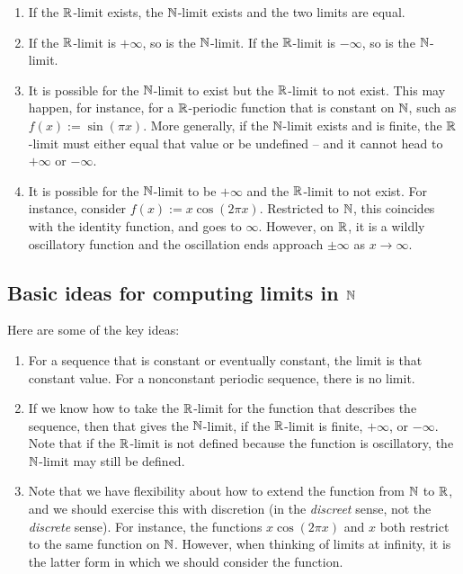 \documentclass[10pt]{amsart}
\begin{document}
\begin{enumerate}
\item If the $\mathbb{R}$-limit exists, the $\mathbb{N}$-limit exists and the two
  limits are equal.
\item If the $\mathbb{R}$-limit is $+\infty$, so is the $\mathbb{N}$-limit. If the
  $\mathbb{R}$-limit is $-\infty$, so is the $\mathbb{N}$-limit.
\item It is possible for the $\mathbb{N}$-limit to exist but the $\mathbb{R}$-limit to
  not exist. This may happen, for instance, for a $\mathbb{R}$-periodic
  function that is constant on $\mathbb{N}$, such as $f(x) := \sin(\pi
  x)$. More generally, if the $\mathbb{N}$-limit exists and is finite, the
  $\mathbb{R}$-limit must either equal that value or be undefined -- and it
  cannot head to $+\infty$ or $-\infty$.
\item It is possible for the $\mathbb{N}$-limit to be $+\infty$ and the
  $\mathbb{R}$-limit to not exist. For instance, consider $f(x) := x\cos(2\pi
  x)$. Restricted to $\mathbb{N}$, this coincides with the identity function,
  and goes to $\infty$. However, on $\mathbb{R}$, it is a wildly oscillatory
  function and the oscillation ends approach $\pm \infty$ as $x \to
  \infty$.
\end{enumerate}

\subsection{Basic ideas for computing limits in $\mathbb{N}$}

Here are some of the key ideas:

\begin{enumerate}
\item For a sequence that is constant or eventually constant, the
  limit is that constant value. For a nonconstant periodic sequence,
  there is no limit.
\item If we know how to take the $\mathbb{R}$-limit for the function that
  describes the sequence, then that gives the $\mathbb{N}$-limit, if the
  $\mathbb{R}$-limit is finite, $+\infty$, or $-\infty$. Note that if the
  $\mathbb{R}$-limit is not defined because the function is oscillatory, the
  $\mathbb{N}$-limit may still be defined.
\item Note that we have flexibility about how to extend the function
  from $\mathbb{N}$ to $\mathbb{R}$, and we should exercise this with discretion (in
  the {\em discreet} sense, not the {\em discrete} sense). For
  instance, the functions $x\cos(2\pi x)$ and $x$ both restrict to the
  same function on $\mathbb{N}$. However, when thinking of limits at infinity,
  it is the latter form in which we should consider the function.
\end{enumerate}
\end{document}
